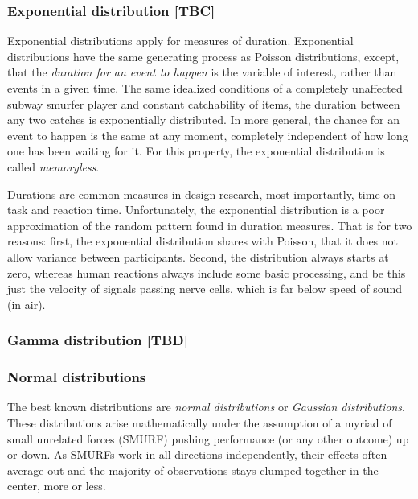 \documentclass[]{svmono}
\theoremstyle{definition}
\theoremstyle{definition}
\theoremstyle{definition}
\theoremstyle{remark}
\begin{document}
\subsubsection{Exponential distribution
{[}TBC{]}}\label{exponential-distribution-tbc}

Exponential distributions apply for measures of duration. Exponential
distributions have the same generating process as Poisson distributions,
except, that the \emph{duration for an event to happen} is the variable
of interest, rather than events in a given time. The same idealized
conditions of a completely unaffected subway smurfer player and constant
catchability of items, the duration between any two catches is
exponentially distributed. In more general, the chance for an event to
happen is the same at any moment, completely independent of how long one
has been waiting for it. For this property, the exponential distribution
is called \emph{memoryless}.

Durations are common measures in design research, most importantly,
time-on-task and reaction time. Unfortunately, the exponential
distribution is a poor approximation of the random pattern found in
duration measures. That is for two reasons: first, the exponential
distribution shares with Poisson, that it does not allow variance
between participants. Second, the distribution always starts at zero,
whereas human reactions always include some basic processing, and be
this just the velocity of signals passing nerve cells, which is far
below speed of sound (in air).

\subsubsection{Gamma distribution
{[}TBD{]}}\label{gamma-distribution-tbd}

\subsubsection{Normal distributions}\label{normal-distributions}

The best known distributions are \emph{normal distributions} or
\emph{Gaussian distributions}. These distributions arise mathematically
under the assumption of a myriad of small unrelated forces (SMURF)
pushing performance (or any other outcome) up or down. As SMURFs work in
all directions independently, their effects often average out and the
majority of observations stays clumped together in the center, more or
less.
\end{document}
